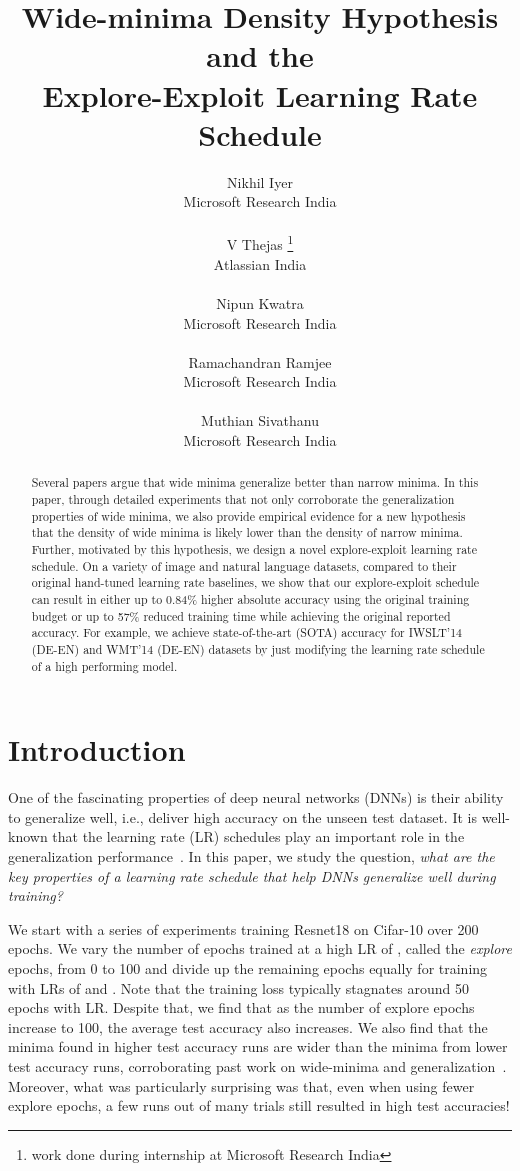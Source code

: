 \documentclass{article} \usepackage{iclr2021_conference,times}
\title{Wide-minima Density Hypothesis and the \\Explore-Exploit Learning Rate Schedule}
\author{
Nikhil Iyer \\
Microsoft Research India \\
\And

V Thejas \thanks{work done during internship at Microsoft Research India} \\
Atlassian India \\
\And

Nipun Kwatra \\
Microsoft Research India \\
\And

Ramachandran Ramjee \\
Microsoft Research India \\
\And

Muthian Sivathanu \\
Microsoft Research India
}
\begin{document}
\maketitle

\begin{abstract}

Several papers argue that wide minima generalize better than narrow minima. In this paper, through detailed experiments that not only corroborate the generalization properties of wide minima, we also
provide empirical evidence for a new hypothesis that the density of wide minima is likely lower than the density of narrow minima.
Further, motivated by this hypothesis, we design a novel explore-exploit learning rate schedule. On a variety of image and natural language datasets, compared to their original hand-tuned learning rate baselines, we show that our explore-exploit schedule can result in either up to 0.84\% higher absolute accuracy using the original training budget or up to 57\% reduced training time while achieving the original reported accuracy. For example, we achieve state-of-the-art (SOTA) accuracy for IWSLT'14 (DE-EN) and WMT'14 (DE-EN) datasets by just modifying the learning rate schedule of a high performing model.


    
\end{abstract} \section{Introduction}
\label{sec:introduction}

One of the fascinating properties of deep neural networks (DNNs) is their ability to generalize well, i.e., deliver high accuracy on the unseen test dataset. It is well-known that the learning rate (LR) schedules  play an important role in the generalization performance~\citep{keskar2016large,wu2018sgd,goyal-imagenet-in-an-hour-2017}. In this paper, we study the question, {\it what are the key properties of a learning rate schedule that help DNNs generalize well during training?} 





We start with a series of experiments training Resnet18 on Cifar-10 over 200 epochs. We vary the number of epochs trained at a high LR of , called the {\it explore} epochs, from 0 to 100  and divide up the remaining epochs equally for training with LRs of  and . Note that the training loss typically stagnates around 50 epochs with  LR. Despite that, we find that as the number of explore epochs increase to 100, the average test accuracy also increases. We also find that the minima found in higher test accuracy runs are wider than the minima from lower test accuracy runs, corroborating past work on wide-minima and generalization~\citep{keskar2016large,hochreiter1997flat,jastrzkebski2017three,wang2018identifying}. Moreover, what was particularly surprising was that, even when using fewer explore epochs, a few runs out of many trials still resulted in high test accuracies!
\end{document}
